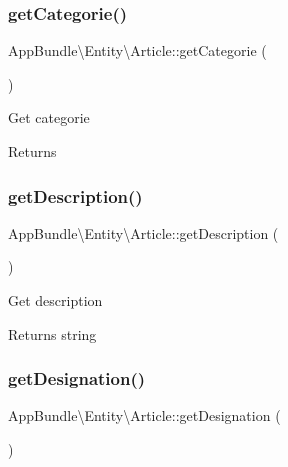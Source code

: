 \subsubsection{\texorpdfstring{get\+Categorie()}{getCategorie()}}
{\footnotesize\ttfamily App\+Bundle\textbackslash{}\+Entity\textbackslash{}\+Article\+::get\+Categorie (\begin{DoxyParamCaption}{ }\end{DoxyParamCaption})}

Get categorie

\begin{DoxyReturn}{Returns}

\end{DoxyReturn}
\mbox{\label{class_app_bundle_1_1_entity_1_1_article_a0772628bb9ddfaebc029ec170740c41b}} 
\subsubsection{\texorpdfstring{get\+Description()}{getDescription()}}
{\footnotesize\ttfamily App\+Bundle\textbackslash{}\+Entity\textbackslash{}\+Article\+::get\+Description (\begin{DoxyParamCaption}{ }\end{DoxyParamCaption})}

Get description

\begin{DoxyReturn}{Returns}
string 
\end{DoxyReturn}
\mbox{\label{class_app_bundle_1_1_entity_1_1_article_ad16c7c1dc8f42d8b3c45111acac8c1cf}} 
\subsubsection{\texorpdfstring{get\+Designation()}{getDesignation()}}
{\footnotesize\ttfamily App\+Bundle\textbackslash{}\+Entity\textbackslash{}\+Article\+::get\+Designation (\begin{DoxyParamCaption}{ }\end{DoxyParamCaption})}

